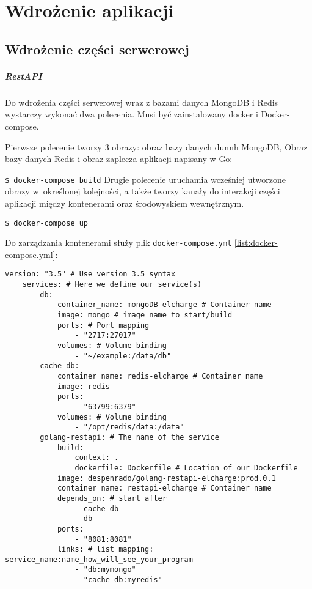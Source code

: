 \chapter{Wdrożenie aplikacji}
\section{Wdrożenie części serwerowej}
\paragraph{RestAPI}

Do wdrożenia części serwerowej wraz z bazami danych MongoDB i Redis wystarczy wykonać dwa polecenia.
Musi być zainstalowany docker i Docker-compose.

Pierwsze polecenie tworzy 3 obrazy: obraz bazy danych dunnh MongoDB, Obraz bazy danych Redis i obraz zaplecza aplikacji napisany w Go:

\texttt{\$ docker-compose build}
Drugie polecenie uruchamia wcześniej utworzone obrazy w~określonej kolejności, a także tworzy kanały do interakcji części aplikacji między kontenerami oraz środowyskiem wewnętrznym.

\texttt{\$ docker-compose up}

Do zarządzania kontenerami służy plik \texttt{docker-compose.yml} \ref{list:docker-compose.yml}:
\begin{lstlisting}[label=list:docker-compose.yml,caption=docker-compose.yml,basicstyle=\tiny\ttfamily]
    version: "3.5" # Use version 3.5 syntax
    services: # Here we define our service(s)
        db:
            container_name: mongoDB-elcharge # Container name
            image: mongo # image name to start/build
            ports: # Port mapping
                - "2717:27017"
            volumes: # Volume binding
                - "~/example:/data/db"
        cache-db:
            container_name: redis-elcharge # Container name
            image: redis
            ports:
                - "63799:6379"
            volumes: # Volume binding
                - "/opt/redis/data:/data"
        golang-restapi: # The name of the service
            build:
                context: .
                dockerfile: Dockerfile # Location of our Dockerfile
            image: despenrado/golang-restapi-elcharge:prod.0.1
            container_name: restapi-elcharge # Container name
            depends_on: # start after
                - cache-db
                - db
            ports:
                - "8081:8081"
            links: # list mapping: service_name:name_how_will_see_your_program
                - "db:mymongo"
                - "cache-db:myredis"
    
\end{lstlisting}

